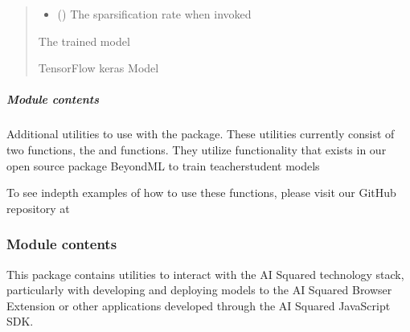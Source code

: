 \documentclass[letterpaper,10pt,english]{sphinxmanual}
\begin{document}
\begin{fulllineitems}
\begin{quote}
\begin{description}
\begin{itemize}
\item {} 
\sphinxAtStartPar
{} (\sphinxstyleliteralemphasis{\sphinxupquote{ (}}\sphinxstyleliteralemphasis{\sphinxupquote{)}}) \textendash{} The sparsification rate when invoked

\end{itemize}

\sphinxAtStartPar
{} \textendash{} The trained model

\sphinxAtStartPar
TensorFlow keras Model

\end{description}\end{quote}

\end{fulllineitems}



\subparagraph{Module contents}
\label{\detokenize{aisquared.utils:module-aisquared.utils}}\label{\detokenize{aisquared.utils:module-contents}}
\sphinxAtStartPar
Additional utilities to use with the  package. These utilities currently consist of two functions, the
 and  functions. They utilize functionality that exists in our open source package BeyondML
to train teacher\sphinxhyphen{}student models

\sphinxAtStartPar
To see in\sphinxhyphen{}depth examples of how to use these functions, please visit our GitHub repository at 


\subsubsection{Module contents}
\label{\detokenize{aisquared:module-aisquared}}\label{\detokenize{aisquared:module-contents}}
\sphinxAtStartPar
This package contains utilities to interact with the AI Squared technology stack, particularly with developing and deploying models to the AI Squared Browser Extension or other applications developed through the AI Squared JavaScript SDK.
\end{document}
